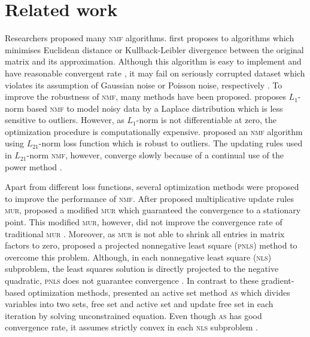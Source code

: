 \section{Related work}
Researchers proposed many \textsc{nmf} algorithms. \citet{lee2001algorithms} first proposes to algorithms which minimises Euclidean distance or Kullback-Leibler divergence between the original matrix and its approximation. Although this algorithm is easy to implement and have reasonable convergent rate \citep{lee2001algorithms}, it may fail on seriously corrupted dataset which violates its assumption of Gaussian noise or Poisson noise, respectively \citep{guan2017truncated}.  To improve the robustness of \textsc{nmf}, many methods have been proposed. \citet{lam2008non} proposes ${L_1}$-norm based \textsc{nmf} to model noisy data by a Laplace distribution which is less sensitive to outliers. However, as $L_1$-norm is not differentiable at zero, the optimization procedure is computationally expensive. \citet{kong2011robust} proposed an \textsc{nmf} algorithm using $L_{21}$-norm loss function which is robust to outliers. The updating rules used in $L_{21}$-norm \textsc{nmf}, however, converge slowly because of a continual use of the power method \citep{guan2017truncated}.

Apart from different loss functions, several optimization methods were proposed to improve the performance of \textsc{nmf}. After \citet{lee2001algorithms} proposed  multiplicative update rules \textsc{mur}, \citet{ lin2007convergence} proposed a modified \textsc{mur} which guaranteed the convergence to a stationary point. This modified \textsc{mur}, however, did not improve the convergence rate of traditional \textsc{mur} \citep{guan2012nenmf}. Moreover, as \textsc{mur} is not able to shrink all entries in matrix factors to zero, \citet{berry2007algorithms} proposed a projected nonnegative least square (\textsc{pnls}) method to overcome this problem. Although, in each nonnegative least square (\textsc{nls}) subproblem, the least squares solution is directly projected to the negative quadratic, \textsc{pnls} does not guarantee convergence \citep{guan2012nenmf}. In contrast to these gradient-based optimization methods, \citet{kim2008nonnegative} presented an active set method \textsc{as} which divides variables into two sets, free set and active set and update free set in each iteration by solving unconstrained equation. Even though \textsc{as} has good convergence rate, it assumes strictly convex in each \textsc{nls} subproblem \citep{kim2008nonnegative}.
